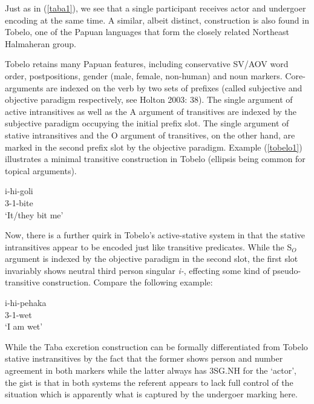 Just as in (\ref{taba1}), we see that a single participant receives actor and undergoer encoding at the same time. A similar, albeit distinct, construction is also found in Tobelo, one of the Papuan languages that form the closely related Northeast Halmaheran group. 

Tobelo retains many Papuan features, including conservative SV/AOV word order, postpositions, gender (male, female, non-human) and noun markers. Core-arguments are indexed on the verb by two sets of prefixes (called subjective and objective paradigm respectively, see Holton 2003: 38). The single argument of active intransitives as well as the A argument of transitives are indexed by the subjective paradigm occupying the initial prefix slot. The single argument of stative intransitives and the O argument of transitives, on the other hand, are marked in the second prefix slot by the objective paradigm. Example (\ref{tobelo1}) illustrates a minimal transitive construction in Tobelo (ellipsis being common for topical arguments).

\ea \label{tobelo1}
\gll i-hi-goli \\
3-1-bite \\
\glft `It/they bit me' \\ 
\endgl
\xe

Now, there is a further quirk in Tobelo's active-stative system in that the stative intransitives appear to be encoded just like transitive predicates. While the S$_O$ argument is indexed by the objective paradigm in the second slot, the first slot invariably shows neutral third person singular \textit{i-}, effecting some kind of pseudo-transitive construction. Compare the following example:

\ea 
\gll i-hi-pehaka \\
3-1-wet \\
\glft `I am wet' \\ 
\endgl
\xe

While the Taba excretion construction can be formally differentiated from Tobelo stative instransitives by the fact that the former shows person and number agreement in both markers while the latter always has 3SG.NH for the `actor', the gist is that in both systems the referent appears to lack full control of the situation which is apparently what is captured by the undergoer marking here.

